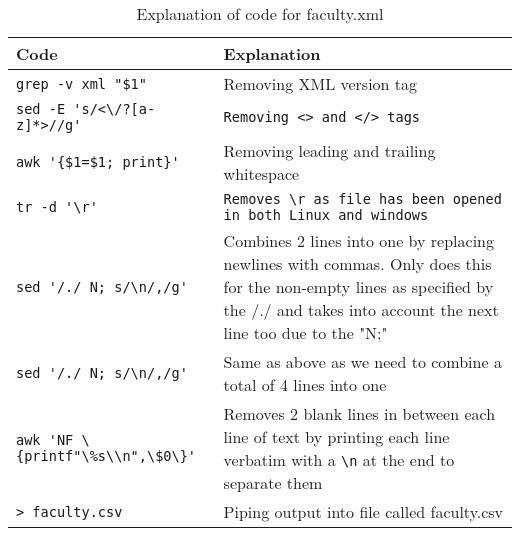 \documentclass{article}
\begin{document}
\begin{table}[H]
    \centering
    \begin{tabularx}{\textwidth}{|X|X|} %
        \hline
        \textbf{Code} & \textbf{Explanation} \\
        \hline
        \verb|grep -v xml "$1"| & Removing XML version tag \\
        \hline
        \verb|sed -E 's/<\/?[a-z]*>//g'| & \verb|Removing <> and </> tags| \\
        \hline 
        \verb|awk '{$1=$1; print}'| & Removing leading and trailing whitespace \\
        \hline 
        \verb|tr -d '\r'| & \texttt{Removes \verb|\r| as file has been opened in both Linux and windows} \\
        \hline 
        \verb|sed '/./ N; s/\n/,/g'| & Combines 2 lines into one by replacing newlines with commas. Only does this for the non-empty lines as specified by the /./ and takes into account the next line too due to the "N;" \\
        \hline 
        \verb|sed '/./ N; s/\n/,/g'| & Same as above as we need to combine a total of 4 lines into one \\
        \hline 
        \texttt{\verb|awk 'NF \{printf"\%s\\n",\$0\}'|} & Removes 2 blank lines in between each line of text by printing each line verbatim with a \verb|\n| at the end to separate them \\
        \hline
        \texttt{> faculty.csv} & Piping output into file called faculty.csv \\
        \hline
    \end{tabularx}
    \caption{Explanation of code for faculty.xml}
\end{table}
\end{document}
